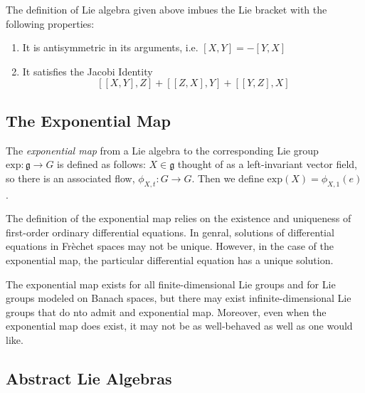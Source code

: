 \begin{rmk}

The definition of Lie algebra given above imbues the Lie bracket with the following properties: 

\begin{enumerate}
	\item It is antisymmetric in its arguments, i.e. $[X,Y] = - [Y,X]$
	\item It satisfies the Jacobi Identity
		\[ [[X,Y],Z]+[[Z,X],Y]+[[Y,Z],X]	\]

\end{enumerate}
\end{rmk}


\subsection{The Exponential Map}


\begin{defn}

	The \textit{exponential map} from a Lie algebra to the corresponding Lie group $ \mathrm{exp}: \mathfrak{g} \to G$ is defined as follows: $X \in \mathfrak{g}$ thought of as a left-invariant vector field, so there is an associated flow, $\phi_{X,t}:G \to G$. Then we define $\mathrm{exp}(X) = \phi_{X,1}(e)$.

\end{defn}


\begin{rmk}

	The definition of the exponential map relies on the existence and uniqueness of first-order ordinary differential equations. In genral, solutions of differential equations in Fr\`echet spaces may not be unique. However, in the case of the exponential map, the particular differential equation has a unique solution.

\end{rmk}


\begin{rmk}

	The exponential map exists for all finite-dimensional Lie groups and for Lie groups modeled on Banach spaces, but there may exist infinite-dimensional Lie groups that do nto admit and exponential map. Moreover, even when the exponential map does exist, it may not be as well-behaved as well as one would like.

\end{rmk}

\subsection{Abstract Lie Algebras}

